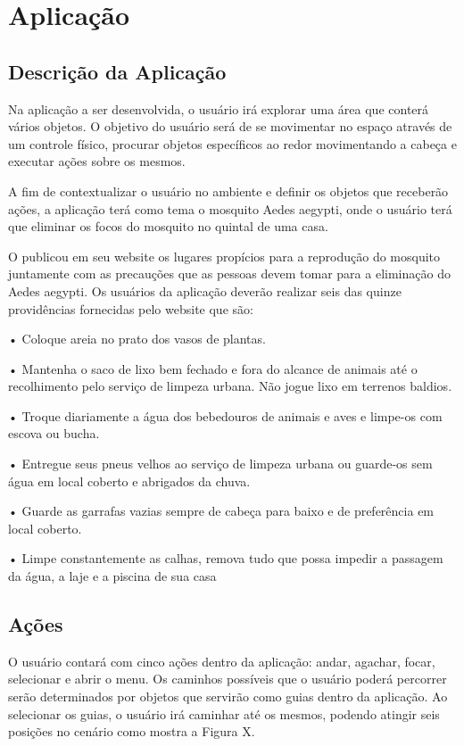 \chapter{Aplicação}
\label{c.aplicacao}

\section{Descrição da Aplicação}
\label{s.descricao}

Na aplicação a ser desenvolvida, o usuário irá explorar uma área que conterá vários objetos. O objetivo do usuário será de se movimentar no espaço através de um controle físico, procurar objetos específicos ao redor movimentando a cabeça e executar ações sobre os mesmos.

A fim de contextualizar o usuário no ambiente e definir os objetos que receberão ações, a aplicação terá como tema o mosquito Aedes aegypti, onde o usuário terá que eliminar os focos do mosquito no quintal de uma casa. 

O  publicou em seu website os lugares propícios para a reprodução do mosquito juntamente com as precauções que as pessoas devem tomar para a eliminação do Aedes aegypti. Os usuários da aplicação deverão realizar seis das quinze providências fornecidas pelo website que são:

•	Coloque areia no prato dos vasos de plantas.

•	Mantenha o saco de lixo bem fechado e fora do alcance de animais até o recolhimento pelo serviço de limpeza urbana. Não jogue lixo em terrenos baldios.

•	Troque diariamente a água dos bebedouros de animais e aves e limpe-os com escova ou bucha.

•	Entregue seus pneus velhos ao serviço de limpeza urbana ou guarde-os sem água em local coberto e abrigados da chuva.

•	Guarde as garrafas vazias sempre de cabeça para baixo e de preferência em local coberto.

•	Limpe constantemente as calhas, remova tudo que possa impedir a passagem da água, a laje e a piscina de sua casa

\section{Ações}
\label{s.acoes}

O usuário contará com cinco ações dentro da aplicação: andar, agachar, focar, selecionar e abrir o menu. Os caminhos possíveis que o usuário poderá percorrer serão determinados por objetos que servirão como guias dentro da aplicação. Ao selecionar os guias, o usuário irá caminhar até os mesmos, podendo atingir seis posições no cenário como mostra a Figura X.


